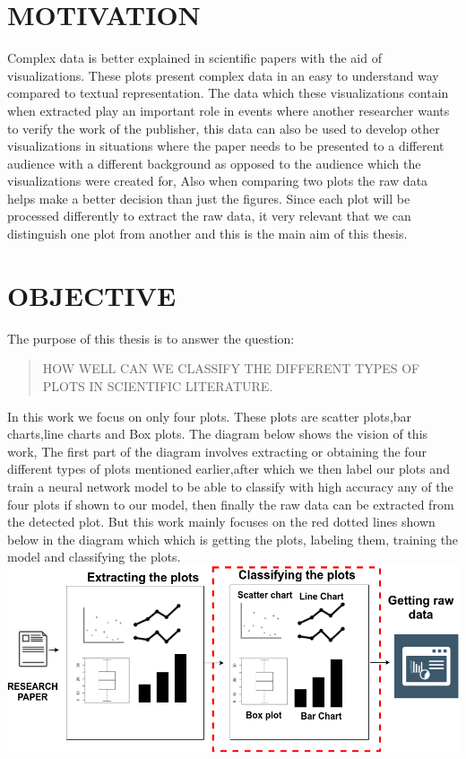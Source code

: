 \documentclass[12pt, a4paper,oneside]{report}
\begin{document}
\section{MOTIVATION}
Complex data is better explained in scientific papers with the aid of visualizations. These plots present complex data in an easy to understand way compared to textual representation. The data which these visualizations contain when extracted play an important role in events where another researcher wants to verify the work of the publisher, this data can also be used to develop other visualizations in situations where the paper needs to be presented to a different audience with a different background as opposed to the audience which the visualizations were created for, Also when comparing two plots the raw data helps make a better decision than just the figures. Since each plot will be processed differently to extract the raw data, it very relevant that we can distinguish one plot from another and this is the main aim of this thesis. 

\section{OBJECTIVE}
The purpose of this thesis is to answer the question: \begin{quote} HOW WELL CAN WE CLASSIFY THE DIFFERENT TYPES OF PLOTS IN SCIENTIFIC LITERATURE.\end{quote} In this work we focus on only four plots. These plots are scatter plots,bar charts,line charts and Box plots. The diagram below shows the vision of this work, The first part of the diagram involves extracting or obtaining  the four different types of plots mentioned earlier,after which we then label our plots and train a neural network model to be able to classify with high accuracy any of the four plots if shown to our model, then finally the raw data can be extracted from the detected plot.
But this work mainly focuses on the red dotted lines shown below in the diagram which which is getting the plots, labeling them, training the model and classifying the plots. \\
 
\includegraphics [scale=0.5] {vision}
\end{document}
